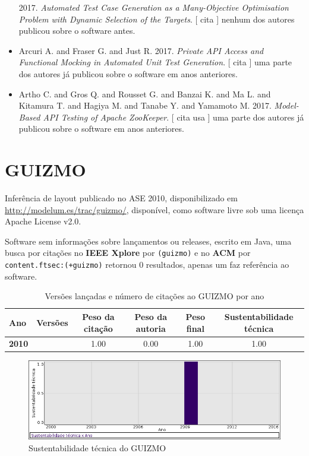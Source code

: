 \begin{itemize}
      2017.
        \textit{ Automated Test Case Generation as a Many-Objective Optimisation Problem with Dynamic Selection of the Targets}.
      [
          cita
      ]
nenhum dos autores publicou sobre o software antes.
\item Arcuri A. and Fraser G. and Just R.
      2017.
        \textit{ Private API Access and Functional Mocking in Automated Unit Test Generation}.
      [
          cita
      ]
uma parte dos autores já publicou sobre o software em anos anteriores.
\item Artho C. and Gros Q. and Rousset G. and Banzai K. and Ma L. and Kitamura T. and Hagiya M. and Tanabe Y. and Yamamoto M.
      2017.
        \textit{ Model-Based API Testing of Apache ZooKeeper}.
      [
          cita
          usa
      ]
uma parte dos autores já publicou sobre o software em anos anteriores.
\end{itemize}
\section{GUIZMO}

Inferência de layout
publicado no ASE 2010,
disponibilizado em \url{http://modelum.es/trac/guizmo/},
disponível,
como software livre
sob uma licença Apache License v2.0.

Software sem informações sobre lançamentos ou releases,
escrito em Java,
uma busca por citações no {\bf IEEE Xplore} por
\texttt{(guizmo)}
e no {\bf ACM} por
\texttt{content.ftsec:(+guizmo)}
retornou
0 resultados,
apenas um faz referência ao software.


\begin{table}[H]
\caption{Versões lançadas e número de citações ao GUIZMO por ano}
\centering
\begin{tabular}{| l | c | c | c | c | c |}
  \hline
  Ano & Versões & Peso da citação & Peso da autoria & Peso final & Sustentabilidade técnica \\
  \hline
            {\bf 2010}
          &
          
          &
          1.00
          &
          0.00
          &
          1.00
          &
            {\color{blue} 1.00}
          \\
\hline
\end{tabular}
\end{table}

\begin{figure}[h]
  \center
  \includegraphics[scale=0.50]{imagens/softwares-charts/guizmo.png}
  \caption{Sustentabilidade técnica do GUIZMO}
\end{figure}


